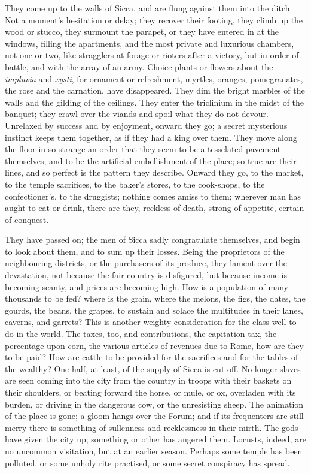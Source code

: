 They come up to the walls of Sicca, and are flung against them into
the ditch. Not a moment's hesitation or delay; they recover their
footing, they climb up the wood or stucco, they surmount the parapet,
or they have entered in at the windows, filling the apartments,
and the most private and luxurious chambers, not one or two, like
stragglers at forage or rioters after a victory, but in order of
battle, and with the array of an army. Choice plants or flowers about
the \emph{impluvia} and \emph{xysti}, for ornament or refreshment,
myrtles, oranges, pomegranates, the rose and the carnation, have
disappeared. They dim the bright marbles of the walls and the gilding
of the ceilings. They enter the triclinium in the midst of the
banquet; they crawl over the viands and spoil what they do not devour.
Unrelaxed by success and by enjoyment, onward they go; a secret
mysterious instinct keeps them together, as if they had a king over
them. They move along the floor in so strange an order that they seem
to be a tesselated pavement themselves, and to be the artificial
embellishment of the place; so true are their lines, and so perfect is
the pattern they describe. Onward they go, to the market, to the
temple sacrifices, to the baker's stores, to the cook-shops, to the
confectioner's, to the druggists; nothing comes amiss to them;
wherever man has aught to eat or drink, there are they, reckless of
death, strong of appetite, certain of conquest.

They have passed on; the men of Sicca sadly congratulate
themselves, and begin to look about them, and to sum up their losses.
Being the proprietors of the neighbouring districts, or the purchasers
of its produce, they lament over the devastation, not because the fair
country is disfigured, but because income is becoming scanty,
and prices are becoming high. How is a population of many thousands to
be fed? where is the grain, where the melons, the figs, the dates, the
gourds, the beans, the grapes, to sustain and solace the multitudes in
their lanes, caverns, and garrets? This is another weighty
consideration for the class well-to-do in the world. The taxes, too,
and contributions, the capitation tax, the percentage upon corn, the
various articles of revenues due to Rome, how are they to be paid? How
are cattle to be provided for the sacrifices and for the tables of the
wealthy? One-half, at least, of the supply of Sicca is cut off. No
longer slaves are seen coming into the city from the country in troops
with their baskets on their shoulders, or beating forward the horse,
or mule, or ox, overladen with its burden, or driving in the dangerous
cow, or the unresisting sheep. The animation of the place is gone; a
gloom hangs over the Forum; and if its frequenters are still merry
there is something of sullenness and recklessness in their mirth. The
gods have given the city up; something or other has angered them.
Locusts, indeed, are no uncommon visitation, but at an earlier season.
Perhaps some temple has been polluted, or some unholy rite practised,
or some secret conspiracy has spread.

